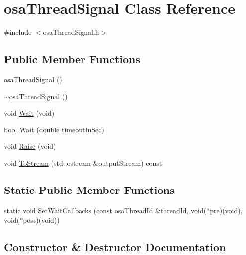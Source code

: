 \hypertarget{classosa_thread_signal}{}\section{osa\+Thread\+Signal Class Reference}
\label{classosa_thread_signal}


{\ttfamily \#include $<$osa\+Thread\+Signal.\+h$>$}

\subsection*{Public Member Functions}
\begin{DoxyCompactItemize}
\item 
\hyperlink{classosa_thread_signal_afb91cea91d17650ffcd67daeb347e399}{osa\+Thread\+Signal} ()
\item 
\hyperlink{classosa_thread_signal_a9fb82ffdc732148decfc5453d6f6eb57}{$\sim$osa\+Thread\+Signal} ()
\item 
void \hyperlink{classosa_thread_signal_a610c820eeae1275b5f7dc3fff316bdc6}{Wait} (void)
\item 
bool \hyperlink{classosa_thread_signal_a424192ab9c92f856c1bdefde93792731}{Wait} (double timeout\+In\+Sec)
\item 
void \hyperlink{classosa_thread_signal_aaf9954186fff5b97e7418aa040e71930}{Raise} (void)
\item 
void \hyperlink{classosa_thread_signal_ac1d0c8f67566f8f1c5832bc3691c6530}{To\+Stream} (std\+::ostream \&output\+Stream) const 
\end{DoxyCompactItemize}
\subsection*{Static Public Member Functions}
\begin{DoxyCompactItemize}
\item 
static void \hyperlink{classosa_thread_signal_ad48014fbc5bfe0925ce170405758e730}{Set\+Wait\+Callbacks} (const \hyperlink{classosa_thread_id}{osa\+Thread\+Id} \&thread\+Id, void($\ast$pre)(void), void($\ast$post)(void))
\end{DoxyCompactItemize}


\subsection{Constructor \& Destructor Documentation}
\hypertarget{classosa_thread_signal_afb91cea91d17650ffcd67daeb347e399}{}
